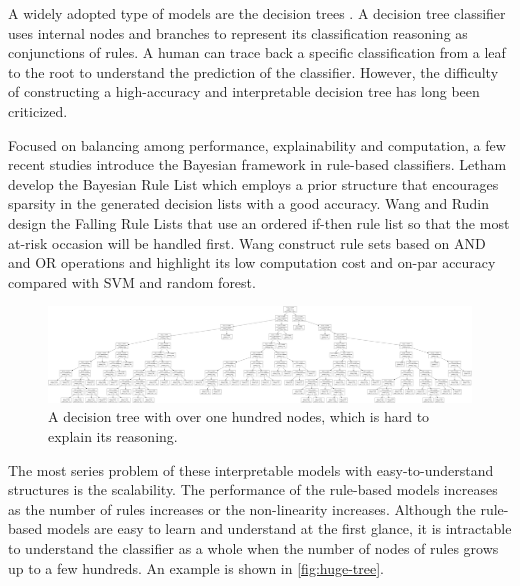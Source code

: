 A widely adopted type of models are the decision trees \cite{breiman1984classificationtree}. A decision tree classifier uses internal nodes and branches to represent its classification reasoning as conjunctions of rules. A human can trace back a specific classification from a leaf to the root to understand the prediction of the classifier. However, the difficulty of constructing a high-accuracy and interpretable decision tree has long been criticized. 

Focused on balancing among performance, explainability and computation, a few recent studies introduce the Bayesian framework in rule-based classifiers. Letham \etal \cite{letham2015stroke} develop the Bayesian Rule List which employs a prior structure that encourages sparsity in the generated decision lists with a good accuracy. Wang and Rudin \cite{wang2015falling} design the Falling Rule Lists that use an ordered if-then rule list so that the most at-risk occasion will be handled first. Wang \etal \cite{wang2017rulesets} construct rule sets based on AND and OR operations and highlight its low computation cost and on-par accuracy compared with SVM and random forest.

\begin{figure}[tb]
  \centering
  \includegraphics[width=1.0\textwidth]{figure/huge-tree}
  \caption{A decision tree with over one hundred nodes, which is hard to explain its reasoning.}
  \label{fig:huge-tree}
\end{figure}

The most series problem of these interpretable models with easy-to-understand structures is the scalability. The performance of the rule-based models increases as the number of rules increases or the non-linearity increases. Although the rule-based models are easy to learn and understand at the first glance, it is intractable to understand the classifier as a whole when the number of nodes of rules grows up to a few hundreds. An example is shown in \autoref{fig:huge-tree}.

